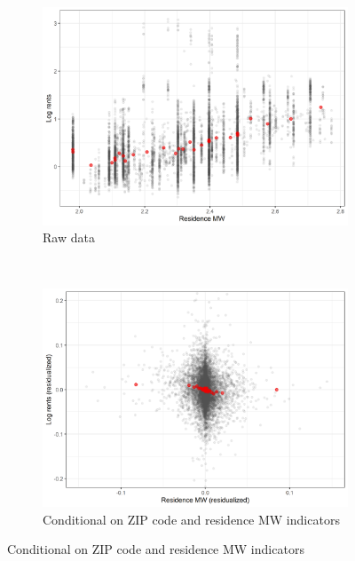 \documentclass{article}
\begin{document}
\clearpage
\begin{figure}[h!]
    \centering
    \caption{The relationship between log rents and the residence MW}
    \label{fig:ln_rents_mw_res}

    \begin{subfigure}{.7\textwidth}
        \caption{Raw data}
        \includegraphics[width = 1\textwidth]
            {plots/cbsa_month_mw_res.png}
    \end{subfigure}\\
    \begin{subfigure}{.7\textwidth}
        \caption{Conditional on ZIP code and residence MW indicators}
        \includegraphics[width = 1\textwidth]
            {plots/cbsa_month_mw_res_resid_mw_wkp_dec.png}
    \end{subfigure}


\end{figure}
\end{document}
